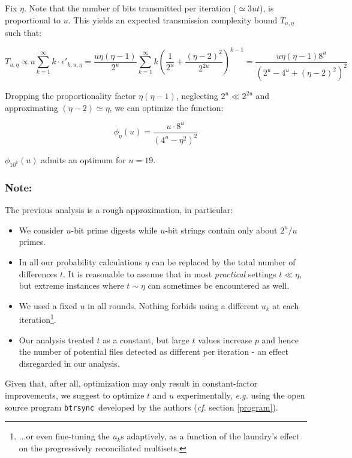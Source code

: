 \documentclass[11pt]{llncs}
\newcommand{\btrsync}{\texttt{btrsync}\xspace}
\begin{document}
Fix $\eta$. Note that the number of bits transmitted per iteration ($\simeq 3ut$), is proportional to $u$. This yields an expected transmission complexity bound $T_{u,\eta}$ such that:\smallskip

\[T_{u,\eta} \propto u \sum_{k=1}^{\infty} k \cdot \epsilon'_{k,u,\eta}=
\frac{u \eta\left(\eta-1\right)}{2^u} \sum_{k=1}^{\infty} k \left( \frac{1}{2^u} + \frac{\left(\eta-2\right)^2}{2^{2u}} \right)^{k-1}=
\frac{u \eta\left(\eta-1\right) 8^u}{\left(2^u-4^u+\left(\eta-2\right)^2\right)^2}\]

Dropping the proportionality factor $\eta\left(\eta-1\right)$, neglecting $2^u \ll 2^{2u}$ and approximating $(\eta-2)\simeq\eta$, we can optimize the function:

\[
\phi_\eta(u)=\frac{u \cdot 8^u}{\left(4^u-\eta^2\right)^2}
\]

$\phi_{10^6}(u)$ admits an optimum for $u=19$.

\subsubsection{Note:} The previous analysis is a rough approximation, in particular:

\begin{itemize}
\item We consider $u$-bit prime digests while $u$-bit strings contain only about $2^u/u$ primes.\smallskip

\item In all our probability calculations $\eta$ can be replaced by the total number of differences $t$. It is reasonable to assume that in most {\sl practical} settings $t \ll \eta$, but extreme instances where $t\sim\eta$ can sometimes be encountered as well.\smallskip

\item We used a fixed $u$ in all rounds. Nothing forbids using a different $u_k$ at each iteration\footnote{...or even fine-tuning the $u_k$s adaptively, as a function of the laundry's effect on the progressively reconciliated multisets.}.

\item Our analysis treated $t$ as a constant, but large $t$ values increase $p$ and hence the number of potential files detected as different per iteration - an effect disregarded in our analysis.
\end{itemize}

Given that, after all, optimization may only result in constant-factor improvements, we suggest to optimize $t$ and $u$ experimentally, {\sl e.g.} using the open source program \btrsync\ developed by the authors ({\sl cf.} section  \ref{program}).
\end{document}
